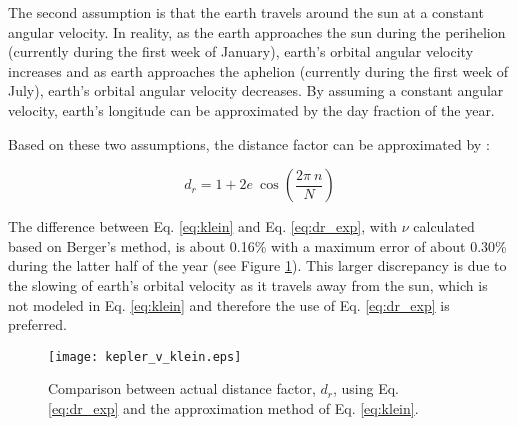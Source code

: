 The second assumption is that the earth travels around the sun at a constant angular velocity. 
In reality, as the earth approaches the sun during the perihelion (currently during the first week of January), earth's orbital angular velocity increases and as earth approaches the aphelion (currently during the first week of July), earth's orbital angular velocity decreases. 
By assuming a constant angular velocity, earth's longitude can be approximated by the day fraction of the year.

Based on these two assumptions, the distance factor can be approximated by \parencite{klein77}:

\begin{equation}
\label{eq:klein}
    d_r = 1 + 2 e \: \cos \left( \frac{2 \pi \: n}{N} \right)
\end{equation}

The difference between Eq. \ref{eq:klein} and Eq. \ref{eq:dr_exp}, with $\nu$ calculated based on Berger's method, is about 0.16\% with a maximum error of about 0.30\% during the latter half of the year (see Figure \ref{fig:klein}). 
This larger discrepancy is due to the slowing of earth's orbital velocity as it travels away from the sun, which is not modeled in Eq. \ref{eq:klein} and therefore the use of Eq. \ref{eq:dr_exp} is preferred.\\


\begin{figure}[ht!]
    \texttt{[image: kepler\_v\_klein.eps]}
    \caption{Comparison between actual distance factor, $d_r$, using Eq. \ref{eq:dr_exp} and the approximation method of Eq. \ref{eq:klein}.}
    \label{fig:klein}
\end{figure}

